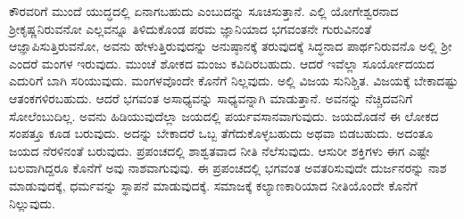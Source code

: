 ಕೌರವರಿಗೆ ಮುಂದೆ ಯುದ್ಧದಲ್ಲಿ ಏನಾಗಬಹುದು ಎಂಬುದನ್ನು ಸೂಚಿಸುತ್ತಾನೆ. ಎಲ್ಲಿ ಯೋಗೇಶ್ವರನಾದ ಶ‍್ರೀಕೃಷ್ಣನಿರುವನೋ ಎಲ್ಲವನ್ನೂ ತಿಳಿದುಕೊಂಡ ಪರಮ ಜ್ಞಾನಿಯಾದ ಭಗವಂತನೇ ಗುರುವಿನಂತೆ ಆಜ್ಞಾಪಿಸುತ್ತಿರುವನೋ, ಅವನು ಹೇಳುತ್ತಿರುವುದನ್ನು ಅನುಷ್ಠಾನಕ್ಕೆ ತರುವುದಕ್ಕೆ ಸಿದ್ಧನಾದ ಪಾರ್ಥನಿರುವನೊ ಅಲ್ಲಿ ಶ‍್ರೀ ಎಂದರೆ ಮಂಗಳ ಇರುವುದು. ಮುಂಚೆ ಶೋಕದ ಮಂಜು ಕವಿದಿರಬಹುದು. ಆದರೆ ಇವೆಲ್ಲಾ ಸೂರ್ಯೋದಯದ ಎದುರಿಗೆ ಬಾಗಿ ಸರಿಯುವುದು. ಮಂಗಳವೊಂದೇ ಕೊನೆಗೆ ನಿಲ್ಲವುದು. ಅಲ್ಲಿ ವಿಜಯ ಸುನಿಶ್ಚಿತ. ವಿಜಯಕ್ಕೆ ಬೇಕಾದಷ್ಟು ಆತಂಕಗಳಿರಬಹುದು. ಆದರೆ ಭಗವಂತ ಅಸಾಧ್ಯವನ್ನು ಸಾಧ್ಯವನ್ನಾಗಿ ಮಾಡುತ್ತಾನೆ. ಅವನನ್ನು ನೆಚ್ಚಿದವನಿಗೆ ಸೋಲೆಂಬುದಿಲ್ಲ. ಅವನು ಹಿಡಿಯುವುದೆಲ್ಲಾ ಜಯದಲ್ಲಿ ಪರ್ಯವಸಾನವಾಗುವುದು. ಜಯದೊಡನೆ ಈ ಲೋಕದ ಸಂಪತ್ತೂ ಕೂಡ ಬರುವುದು. ಅದನ್ನು ಬೇಕಾದರೆ ಒಬ್ಬ ತೆಗೆದುಕೊಳ್ಳಬಹುದು ಅಥವಾ ಬಿಡಬಹುದು. ಅದಂತೂ ಜಯದ ನೆರಳಿನಂತೆ ಬರುವುದು. ಪ್ರಪಂಚದಲ್ಲಿ ಶಾಶ್ವತವಾದ ನೀತಿ ನೆಲೆಸುವುದು. ಆಸುರೀ ಶಕ್ತಿಗಳು ಈಗ ಎಷ್ಟೇ ಬಲವಾಗಿದ್ದರೂ ಕೊನೆಗೆ ಅವು ನಾಶವಾಗುವುವು. ಈ ಪ್ರಪಂಚದಲ್ಲಿ ಭಗವಂತ ಅವತರಿಸುವುದೇ ದುರ್ಜನರನ್ನು ನಾಶ ಮಾಡುವುದಕ್ಕೆ, ಧರ್ಮವನ್ನು ಸ್ಥಾಪನೆ ಮಾಡುವುದಕ್ಕೆ. ಸಮಾಜಕ್ಕೆ ಕಲ್ಯಾಣಕಾರಿಯಾದ ನೀತಿಯೊಂದೇ ಕೊನೆಗೆ ನಿಲ್ಲುವುದು.

